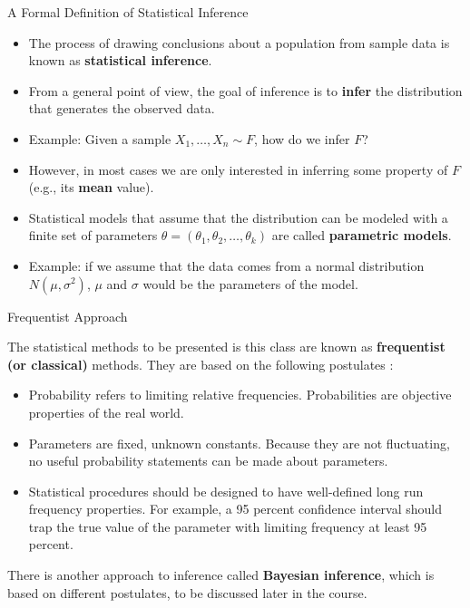 \documentclass[handout]{beamer}
\begin{document}
\begin{frame}{A Formal Definition of Statistical Inference }
\scriptsize{
\begin{itemize}
 \item The process of drawing conclusions about a population from sample data is known as \textbf{statistical inference}.
\item From a general point of view, the goal of inference is to \textbf{infer} the distribution that generates the observed data.
\item Example: Given a sample $X_1, \dots, X_n \sim F$, how do we infer $F$? 
\item However, in most cases we are only interested in inferring some property of $F$ (e.g., its \textbf{mean} value).
\item Statistical models that assume that the distribution can be modeled with a finite set of parameters $\theta= (\theta_{1},\theta_{2},\dots,\theta_{k})$ are called \textbf{parametric models}. 
\item Example: if we assume that the data comes from a normal distribution $N(\mu,\sigma^2)$, $\mu$ and $\sigma$ would be the parameters of the model. 
\end{itemize}

} 
\end{frame}


\begin{frame}{Frequentist Approach}
\scriptsize{
The statistical methods to be presented is this class are known as \textbf{frequentist (or classical)} methods. They are based on the following postulates  \cite{wasserman2013all}:
\begin{itemize}
\item Probability refers to limiting relative frequencies. Probabilities are objective properties of the real world.
\item Parameters are fixed, unknown constants. Because they are not fluctuating, no useful probability statements can be made about parameters.
\item Statistical procedures should be designed to have well-defined long run frequency properties. For example, a 95 percent confidence interval should trap the true value of the parameter with limiting frequency at least 95 percent.
\end{itemize}
There is another approach to inference called \textbf{Bayesian inference}, which is based on different postulates, to be discussed later in the course.

} 
\end{frame}
\end{document}
